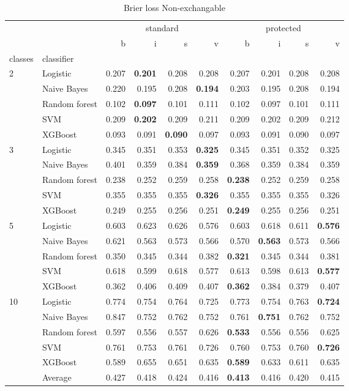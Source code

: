 \begin{table}
\caption{Brier loss Non-exchangable}
\begin{tabular}{l|l|rrrr|rrrr}
\toprule
 &  & \multicolumn{4}{c}{standard} & \multicolumn{4}{c}{protected} \\
 &  & b & i & s & v & b & i & s & v \\
classes & classifier &  &  &  &  &  &  &  &  \\
\midrule
\midrule
\multirow[c]{5}{*}{2} & Logistic & 0.207 & \textbf{0.201} & 0.208 & 0.208 & 0.207 & 0.201 & 0.208 & 0.208 \\
 & Naive Bayes & 0.220 & 0.195 & 0.208 & \textbf{0.194} & 0.203 & 0.195 & 0.208 & 0.194 \\
 & Random forest & 0.102 & \textbf{0.097} & 0.101 & 0.111 & 0.102 & 0.097 & 0.101 & 0.111 \\
 & SVM & 0.209 & \textbf{0.202} & 0.209 & 0.211 & 0.209 & 0.202 & 0.209 & 0.212 \\
 & XGBoost & 0.093 & 0.091 & \textbf{0.090} & 0.097 & 0.093 & 0.091 & 0.090 & 0.097 \\
\midrule
\multirow[c]{5}{*}{3} & Logistic & 0.345 & 0.351 & 0.353 & \textbf{0.325} & 0.345 & 0.351 & 0.352 & 0.325 \\
 & Naive Bayes & 0.401 & 0.359 & 0.384 & \textbf{0.359} & 0.368 & 0.359 & 0.384 & 0.359 \\
 & Random forest & 0.238 & 0.252 & 0.259 & 0.258 & \textbf{0.238} & 0.252 & 0.259 & 0.258 \\
 & SVM & 0.355 & 0.355 & 0.355 & \textbf{0.326} & 0.355 & 0.355 & 0.355 & 0.326 \\
 & XGBoost & 0.249 & 0.255 & 0.256 & 0.251 & \textbf{0.249} & 0.255 & 0.256 & 0.251 \\
\midrule
\multirow[c]{5}{*}{5} & Logistic & 0.603 & 0.623 & 0.626 & 0.576 & 0.603 & 0.618 & 0.611 & \textbf{0.576} \\
 & Naive Bayes & 0.621 & 0.563 & 0.573 & 0.566 & 0.570 & \textbf{0.563} & 0.573 & 0.566 \\
 & Random forest & 0.350 & 0.345 & 0.344 & 0.382 & \textbf{0.321} & 0.345 & 0.344 & 0.381 \\
 & SVM & 0.618 & 0.599 & 0.618 & 0.577 & 0.613 & 0.598 & 0.613 & \textbf{0.577} \\
 & XGBoost & 0.362 & 0.406 & 0.409 & 0.407 & \textbf{0.362} & 0.384 & 0.379 & 0.407 \\
\midrule
\multirow[c]{5}{*}{10} & Logistic & 0.774 & 0.754 & 0.764 & 0.725 & 0.773 & 0.754 & 0.763 & \textbf{0.724} \\
 & Naive Bayes & 0.847 & 0.752 & 0.762 & 0.752 & 0.761 & \textbf{0.751} & 0.762 & 0.752 \\
 & Random forest & 0.597 & 0.556 & 0.557 & 0.626 & \textbf{0.533} & 0.556 & 0.556 & 0.625 \\
 & SVM & 0.761 & 0.753 & 0.761 & 0.726 & 0.760 & 0.753 & 0.760 & \textbf{0.726} \\
 & XGBoost & 0.589 & 0.655 & 0.651 & 0.635 & \textbf{0.589} & 0.633 & 0.611 & 0.635 \\\midrule\ & Average & 0.427 & 0.418 & 0.424 & 0.416 & \textbf{0.413} & 0.416 & 0.420 & 0.415 \\
\bottomrule
\end{tabular}
\end{table}
